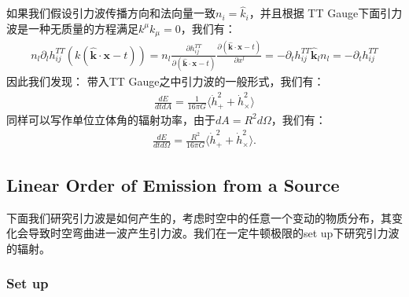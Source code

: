 如果我们假设引力波传播方向和法向量一致$ n_i = \hat{k}_i $，并且根据 TT Gauge下面引力波是一种无质量的方程满足$
k^\mu k_\mu = 0 $，我们有：
\begin{align}
  n_l \partial_l h_{ij}^{TT}(k (\hat{\mathbf{k}} \cdot \mathbf{x} -
  t)) = n_l \frac{\partial h_{ij}^{TT}}{ \partial (\hat{\mathbf{k}}
  \cdot \mathbf{x} - t)} \frac{\partial (\hat{\mathbf{k}} \cdot
  \mathbf{x} - t)}{\partial x^l} = -\partial_t h_{ij}^{TT}
  \hat{\mathbf{k}}_l n_l = -\partial_t h_{ij}^{TT}
\end{align}
因此我们发现：
带入TT Gauge之中引力波的一般形式，我们有：
\begin{align}
  \frac{dE}{dtdA} = \frac{1}{16\pi G} \langle \dot{h}_+^2 +
  \dot{h}_\times^2 \rangle
\end{align}
同样可以写作单位立体角的辐射功率，由于$ dA = R^2 d \Omega $，我们有：
\begin{align}\label{eq:gwpowerfluxsolidangle}
  \frac{dE}{dtd\Omega} = \frac{R^2}{16\pi G} \langle \dot{h}_+^2 +
  \dot{h}_\times^2 \rangle.
\end{align}

\subsection{Linear Order of Emission from a Source}

下面我们研究引力波是如何产生的，考虑时空中的任意一个变动的物质分布，其变化会导致时空弯曲进一波产生引力波。我们在一定牛顿极限的set up下研究引力波的辐射。

\subsubsection{Set up}


